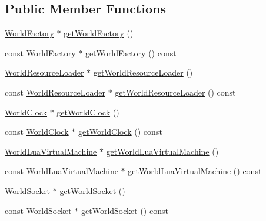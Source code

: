\subsection*{Public Member Functions}
\begin{DoxyCompactItemize}
\item 
\mbox{\hyperlink{classnjli_1_1_world_factory}{World\+Factory}} $\ast$ \mbox{\hyperlink{classnjli_1_1_world_a28299874538b8a714bcbae908760a364}{get\+World\+Factory}} ()
\item 
const \mbox{\hyperlink{classnjli_1_1_world_factory}{World\+Factory}} $\ast$ \mbox{\hyperlink{classnjli_1_1_world_abfd08290519a0525e79f8961cff41c33}{get\+World\+Factory}} () const
\item 
\mbox{\hyperlink{classnjli_1_1_world_resource_loader}{World\+Resource\+Loader}} $\ast$ \mbox{\hyperlink{classnjli_1_1_world_a094d454c35f0afea279bb5fbb39c196a}{get\+World\+Resource\+Loader}} ()
\item 
const \mbox{\hyperlink{classnjli_1_1_world_resource_loader}{World\+Resource\+Loader}} $\ast$ \mbox{\hyperlink{classnjli_1_1_world_a78357165d6bc4ef06ef774d4e0606bc9}{get\+World\+Resource\+Loader}} () const
\item 
\mbox{\hyperlink{classnjli_1_1_world_clock}{World\+Clock}} $\ast$ \mbox{\hyperlink{classnjli_1_1_world_a00797432cd913a07ad852e703cbf7278}{get\+World\+Clock}} ()
\item 
const \mbox{\hyperlink{classnjli_1_1_world_clock}{World\+Clock}} $\ast$ \mbox{\hyperlink{classnjli_1_1_world_a7edeaa8b2caed5240128952e85ea5b12}{get\+World\+Clock}} () const
\item 
\mbox{\hyperlink{classnjli_1_1_world_lua_virtual_machine}{World\+Lua\+Virtual\+Machine}} $\ast$ \mbox{\hyperlink{classnjli_1_1_world_a6ebccef746ad4e44455bae7698839e29}{get\+World\+Lua\+Virtual\+Machine}} ()
\item 
const \mbox{\hyperlink{classnjli_1_1_world_lua_virtual_machine}{World\+Lua\+Virtual\+Machine}} $\ast$ \mbox{\hyperlink{classnjli_1_1_world_a82f0b1f8d27a311ec99b67d778e121a5}{get\+World\+Lua\+Virtual\+Machine}} () const
\item 
\mbox{\hyperlink{classnjli_1_1_world_socket}{World\+Socket}} $\ast$ \mbox{\hyperlink{classnjli_1_1_world_a245f64dbfb8ac4b9aa405c05c58a77e5}{get\+World\+Socket}} ()
\item 
const \mbox{\hyperlink{classnjli_1_1_world_socket}{World\+Socket}} $\ast$ \mbox{\hyperlink{classnjli_1_1_world_a58cd945663087fae147a88f76a984f83}{get\+World\+Socket}} () const
\item 

\end{DoxyCompactItemize}
